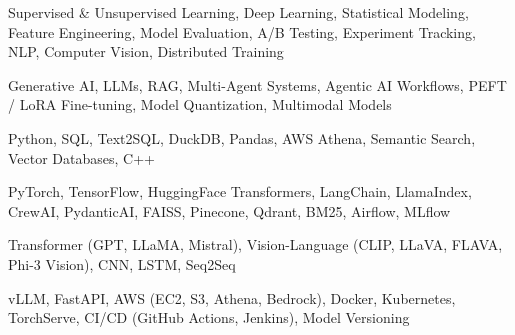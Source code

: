 \documentclass[letter,10pt]{article}
\begin{document}
 Supervised \& Unsupervised Learning, Deep Learning, Statistical Modeling, Feature Engineering, Model Evaluation, A/B Testing, Experiment Tracking, NLP, Computer Vision, Distributed Training\par\vspace{2pt}

 Generative AI, LLMs, RAG, Multi-Agent Systems, Agentic AI Workflows, PEFT / LoRA Fine-tuning, Model Quantization, Multimodal Models\par\vspace{2pt}

 Python, SQL, Text2SQL, DuckDB, Pandas, AWS Athena, Semantic Search, Vector Databases, C++\par\vspace{2pt}

 PyTorch, TensorFlow, HuggingFace Transformers, LangChain, LlamaIndex, CrewAI, PydanticAI, FAISS, Pinecone, Qdrant, BM25, Airflow, MLflow\par\vspace{2pt}

 Transformer (GPT, LLaMA, Mistral), Vision-Language (CLIP, LLaVA, FLAVA, Phi-3 Vision), CNN, LSTM, Seq2Seq\par\vspace{2pt}

 vLLM, FastAPI, AWS (EC2, S3, Athena, Bedrock), Docker, Kubernetes, TorchServe, CI/CD (GitHub Actions, Jenkins), Model Versioning
\end{document}
